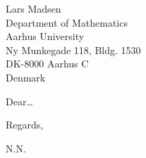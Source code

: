 \documentclass[%
 english,              %
 unit=math,            %
]{aultrdesign}
\begin{document}
\begin{ColophonData}
\end{ColophonData}
\begin{ReceiverAddress}
  Lars Madsen\\
  Department of Mathematics\\
  Aarhus University\\
  Ny Munkegade 118, Bldg. 1530\\
  DK-8000 Aarhus C\\
  Denmark
\end{ReceiverAddress}

\begin{Letter}
\opening{Dear\dots}

\kant[1] %

\closing{Regards,}

\begin{CopyTo}
  \item N.N.
\end{CopyTo}
\end{Letter}
\end{document}

